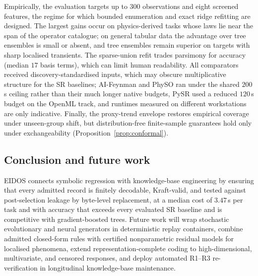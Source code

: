 Empirically, the evaluation targets up to 300 observations and eight screened features, the regime for which bounded enumeration and exact ridge refitting are designed. The largest gains occur on physics-derived tasks whose laws lie near the span of the operator catalogue; on general tabular data the advantage over tree ensembles is small or absent, and tree ensembles remain superior on targets with sharp localised transients. The sparse-union refit trades parsimony for accuracy (median \(17\) basis terms), which can limit human readability. All comparators received discovery-standardised inputs, which may obscure multiplicative structure for the SR baselines; AI-Feynman and PhySO ran under the shared \(200\)\,s ceiling rather than their much longer native budgets, PySR used a reduced \(120\)\,s budget on the OpenML track, and runtimes measured on different workstations are only indicative. Finally, the proxy-trend envelope restores empirical coverage under unseen-group shift, but distribution-free finite-sample guarantees hold only under exchangeability (Proposition~\ref{prop:conformal}).

\subsection{Conclusion and future work}\label{sec:conclusion}

EIDOS connects symbolic regression with knowledge-base engineering by ensuring that every admitted record is finitely decodable, Kraft-valid, and tested against post-selection leakage by byte-level replacement, at a median cost of \(3.47\)\,s per task and with accuracy that exceeds every evaluated SR baseline and is competitive with gradient-boosted trees. Future work will wrap stochastic evolutionary and neural generators in deterministic replay containers, combine admitted closed-form rules with certified nonparametric residual models for localised phenomena, extend representation-complete coding to high-dimensional, multivariate, and censored responses, and deploy automated R1--R3 re-verification in longitudinal knowledge-base maintenance.
